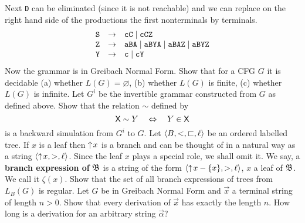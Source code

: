 Next {\tt D} can be eliminated (since it is not reachable)
and we can replace on the right hand side of the productions
the first nonterminals by terminals.
\begin{equation}
\begin{array}{l@{\quad\pf\quad}l}
\mbox{\tt S} & \mbox{\tt cC} \mid \mbox{\tt cCZ} \\
\mbox{\tt Z} & \mbox{\tt aBA} \mid \mbox{\tt aBYA}
    \mid \mbox{\tt aBAZ} \mid \mbox{\tt aBYZ} \\
\mbox{\tt Y} & \mbox{\tt c} \mid \mbox{\tt cY}
\end{array}
\end{equation}
Now the grammar is in Greibach Normal Form.
\vplatz
\exercise
Show that for a CFG $G$ it is decidable
(a) whether $L(G) = \varnothing$, (b) whether $L(G)$ is
finite, (c) whether $L(G)$ is infinite.
\vplatz
\exercise
Let $G^i$ be the invertible grammar constructed from
$G$ as defined above.  Show that the relation $\sim$
defined by
\begin{equation}
\textsf{X} \sim Y \quad \Leftrightarrow \quad Y \in \textsf{X}
\end{equation}
is a backward simulation from $G^i$ to $G$.
\vplatz
\exercise
\label{uebung:zweig}
Let $\langle B, <, \sqsubset, \ell\rangle$ be an ordered labelled
tree. If $x$ is a leaf then ${\uparrow\! x}$ is a branch and can
be thought of in a natural way as a string $\langle {\uparrow\! x},
>, \ell\rangle$. Since the leaf $x$ plays a special role, we
shall omit it. We say, a \textbf{branch expression of} $\mathfrak{B}$ is a
string of the form $\langle {\uparrow\! x} - \{x\}, >, \ell\rangle$, $x$
a leaf of $\mathfrak{B}$. We call it $\zeta(x)$. Show that the set of 
all branch expressions of trees from $L_B(G)$ is regular.
\vplatz
\exercise
Let $G$ be in Greibach Normal Form and $\vec{x}$ a terminal
string of length $n > 0$. Show that every derivation of
$\vec{x}$ has exactly the length $n$. How long is a derivation 
for an arbitrary string $\vec{\alpha}$?
